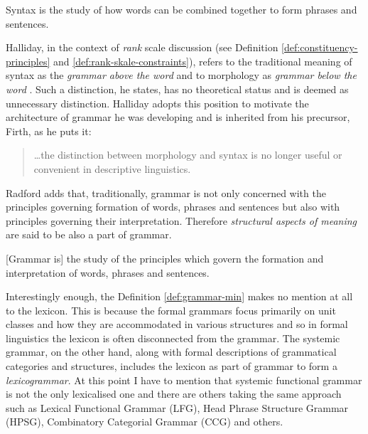 \begin{definition}\label{def:syntax-min}
Syntax is the study of how words can be combined together to form phrases and sentences. \citep[1]{Radford1997}
\end{definition}

Halliday, in the context of \textit{rank} scale discussion (see Definition \ref{def:constituency-principles} and \ref{def:rank-skale-constraints}), refers to the traditional meaning of syntax as the \textit{grammar above the word} and to morphology as \textit{grammar below the word} \citep[ 51]{Halliday2002}. Such a distinction, he states, has no theoretical status and is deemed as unnecessary distinction. Halliday adopts this position to motivate the architecture of grammar he was developing and is inherited from his precursor, Firth, as he puts it: 
\begin{quote}
	\dots the distinction between morphology and syntax is no longer useful or convenient in descriptive linguistics. \citep[14]{Firth1957}
\end{quote}


Radford adds that, traditionally, grammar is not only concerned with the principles governing formation of words, phrases and sentences but also with principles governing their interpretation. Therefore \textit{structural aspects of meaning} are said to be also a part of grammar. 

\begin{definition}\label{def:grammar-min}
[Grammar is] the study of the principles which govern the formation and interpretation of words, phrases and sentences. \citep[1]{Radford1997}
\end{definition}

Interestingly enough, the Definition \ref{def:grammar-min} makes no mention at all to the lexicon. This is because the formal grammars focus primarily on unit classes and how they are accommodated in various structures and so in formal linguistics the lexicon is often disconnected from the grammar. The systemic grammar, on the other hand, along with formal descriptions of grammatical categories and structures, includes the lexicon as part of grammar to form a \textit{lexicogrammar}. At this point I have to mention that systemic functional grammar is not the only lexicalised one and there are others taking the same approach such as 
Lexical Functional Grammar (LFG), Head Phrase Structure Grammar (HPSG), Combinatory Categorial Grammar (CCG) and others. 

